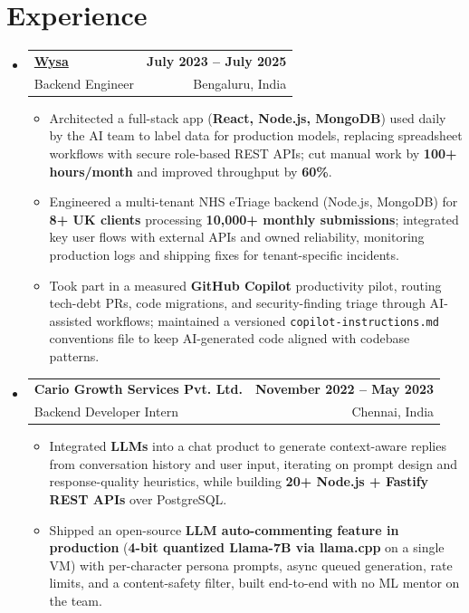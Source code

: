 \documentclass[letterpaper,10pt]{article}
\makeatletter
\newcommand{\resumeItem}[1]{
  \item\small{#1\vspace{-1pt}}
}
\newcommand{\resumeSubheading}[4]{
  \vspace{1pt}\item
    \begin{tabular*}{0.985\textwidth}[t]{l@{\extracolsep{\fill}}r}
      \textbf{#1} & \textbf{\small #2} \\
      {\small\color{ResumeSlate} #3} & {\small\color{ResumeSlate} #4} \\
    \end{tabular*}\vspace{-6pt}
}
\newcommand{\resumeSubHeadingListStart}{\begin{itemize}[leftmargin=0.0in, label={}, itemsep=2pt, topsep=2pt]}
\newcommand{\resumeSubHeadingListEnd}{\end{itemize}}
\newcommand{\resumeItemListStart}{\begin{itemize}[leftmargin=0.18in, itemsep=2pt, topsep=1pt]}
\newcommand{\resumeItemListEnd}{\end{itemize}\vspace{-4pt}}
\makeatother
\begin{document}
\section{Experience}
\resumeSubHeadingListStart
  \resumeSubheading
    {\href{https://www.wysa.io}{Wysa}}{July 2023 -- July 2025}
    {Backend Engineer}{Bengaluru, India}
    \resumeItemListStart
      \resumeItem{Architected a full-stack app (\textbf{React, Node.js, MongoDB}) used daily by the AI team to label data for production models, replacing spreadsheet workflows with secure role-based REST APIs; cut manual work by \textbf{100+ hours/month} and improved throughput by \textbf{60\%}.}
      \resumeItem{Engineered a multi-tenant NHS eTriage backend (Node.js, MongoDB) for \textbf{8+ UK clients} processing \textbf{10{,}000+ monthly submissions}; integrated key user flows with external APIs and owned reliability, monitoring production logs and shipping fixes for tenant-specific incidents.}
      \resumeItem{Took part in a measured \textbf{GitHub Copilot} productivity pilot, routing tech-debt PRs, code migrations, and security-finding triage through AI-assisted workflows; maintained a versioned \texttt{copilot-instructions.md} conventions file to keep AI-generated code aligned with codebase patterns.}
    \resumeItemListEnd
  \resumeSubheading
    {Cario Growth Services Pvt. Ltd.}{November 2022 -- May 2023}
    {Backend Developer Intern}{Chennai, India}
    \resumeItemListStart
      \resumeItem{Integrated \textbf{LLMs} into a chat product to generate context-aware replies from conversation history and user input, iterating on prompt design and response-quality heuristics, while building \textbf{20+ Node.js + Fastify REST APIs} over PostgreSQL.}
      \resumeItem{Shipped an open-source \textbf{LLM auto-commenting feature in production} (\textbf{4-bit quantized Llama-7B via llama.cpp} on a single VM) with per-character persona prompts, async queued generation, rate limits, and a content-safety filter, built end-to-end with no ML mentor on the team.}
    \resumeItemListEnd
\resumeSubHeadingListEnd
\vspace{-4pt}
\end{document}
